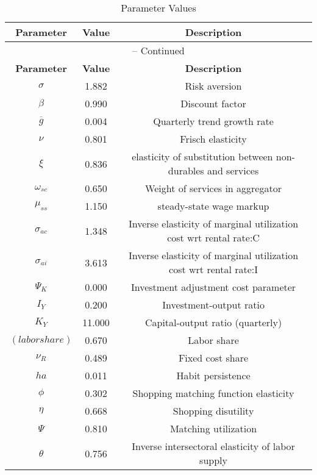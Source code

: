 \begin{center}
\begin{longtable}{ccc}
\caption{Parameter Values}\\%
\toprule%
\multicolumn{1}{c}{\textbf{Parameter}} &
\multicolumn{1}{c}{\textbf{Value}} &
 \multicolumn{1}{c}{\textbf{Description}}\\%
\midrule%
\endfirsthead
\multicolumn{3}{c}{{\tablename} \thetable{} -- Continued}\\%
\midrule%
\multicolumn{1}{c}{\textbf{Parameter}} &
\multicolumn{1}{c}{\textbf{Value}} &
  \multicolumn{1}{c}{\textbf{Description}}\\%
\midrule%
\endhead
${\sigma}$ 	 & 	 1.882 	 & 	 Risk aversion\\
${\beta}$ 	 & 	 0.990 	 & 	 Discount factor\\
${\overline{g}}$ 	 & 	 0.004 	 & 	 Quarterly trend growth rate\\
$\nu$ 	 & 	 0.801 	 & 	 Frisch elasticity\\
$\xi$ 	 & 	 0.836 	 & 	 elasticity of substitution between non-durables and services\\
$\omega_{sc}$ 	 & 	 0.650 	 & 	 Weight of services in aggregator\\
$\mu_{ss}$ 	 & 	 1.150 	 & 	 steady-state wage markup\\
${\sigma_{ac}}$ 	 & 	 1.348 	 & 	 Inverse elasticity of marginal utilization cost wrt rental rate:C\\
${\sigma_{ai}}$ 	 & 	 3.613 	 & 	 Inverse elasticity of marginal utilization cost wrt rental rate:I\\
${\Psi_{K}}$ 	 & 	 0.000 	 & 	 Investment adjustment cost parameter\\
${I_Y}$ 	 & 	 0.200 	 & 	 Investment-output ratio\\
${K_Y}$ 	 & 	 11.000 	 & 	 Capital-output ratio (quarterly)\\
$(labor share)$ 	 & 	 0.670 	 & 	 Labor share\\
${\nu_R}$ 	 & 	 0.489 	 & 	 Fixed cost share\\
${ha}$ 	 & 	 0.011 	 & 	 Habit persistence\\
${\phi}$ 	 & 	 0.302 	 & 	 Shopping matching function elasticity\\
${\eta}$ 	 & 	 0.668 	 & 	 Shopping disutility\\
${\Psi}$ 	 & 	 0.810 	 & 	 Matching utilization\\
${\theta}$ 	 & 	 0.756 	 & 	 Inverse intersectoral elasticity of labor supply\\

\end{longtable}
\end{center}
